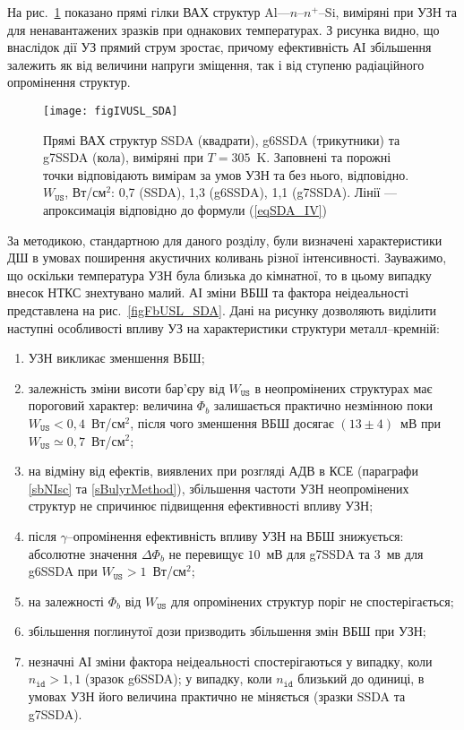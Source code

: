 На рис.~\ref{figIVUSL_SDA} показано прямі гілки ВАХ структур Al---$n$--$n^+$--Si, виміряні при УЗН та для ненавантажених
зразків при однакових температурах.
З рисунка видно, що внаслідок дії УЗ прямий струм зростає, причому
ефективність АІ збільшення залежить як від величини напруги зміщення, так і від ступеню радіаційного опромінення структур.

\begin{figure}[b]
\center
\texttt{[image: figIVUSL\_SDA]}
\caption{\label{figIVUSL_SDA}
Прямі  ВАХ  структур SSDA (квадрати), g6SSDA (трикутники) та g7SSDA (кола), виміряні при $T=305$~K.
Заповнені та порожні точки відповідають вимірам за умов УЗН та без нього, відповідно.
$W_\mathtt{US}$, Вт/см$^2$: 0,7 (SSDA), 1,3 (g6SSDA), 1,1 (g7SSDA).
Лінії --- апроксимація відповідно до формули (\ref{eqSDA_IV})
}%
\end{figure}

За методикою, стандартною для даного розділу, були визначені характеристики ДШ в умовах поширення акустичних коливань різної інтенсивності.
Зауважимо, що оскільки температура УЗН була близька до кімнатної, то в цьому випадку внесок НТКС знехтувано малий.
АІ зміни ВБШ та фактора неідеальності представлена на рис.~\ref{figFbUSL_SDA}.
Дані на рисунку дозволяють виділити наступні особливості  впливу УЗ на характеристики структури металл--кремній:
\begin{enumerate}[label=\asbuk*),leftmargin=0em,itemindent=1.5em]
\item УЗН викликає зменшення ВБШ;

\item залежність зміни висоти бар'єру від $W_\mathtt{US}$ в неопромінених структурах має пороговий характер:
     величина $\Phi_b$ залишається практично незмінною поки \mbox{$W_\mathtt{US}<0,4$~Вт/см$^2$}, після чого
    зменшення ВБШ досягає $(13\pm4)$~мВ при $W_\mathtt{US}\simeq0,7$~Вт/см$^2$;

\item на відміну від ефектів, виявлених при розгляді АДВ в КСЕ (параграфи \ref{sbNIsc} та \ref{sBulyrMethod}), збільшення частоти УЗН неопромінених структур не спричинює
підвищення ефективності впливу УЗН;

\item після $\gamma$--опромінення ефективність впливу УЗН на ВБШ знижується:
абсолютне значення $\Delta\Phi_b$ не перевищує $10$~мВ для g7SSDA та $3$~мв  для g6SSDA при $W_\mathtt{US}>1$~Вт/см$^2$;

\item на залежності $\Phi_b$ від $W_\mathtt{US}$ для опромінених структур поріг не спостерігається;

\item збільшення поглинутої дози призводить збільшення змін ВБШ при УЗН;

\item незначні АІ зміни фактора неідеальності спостерігаються у випадку, коли $n_\mathtt{id}>1,1$ (зразок g6SSDA);
    у випадку, коли $n_\mathtt{id}$ близький до одиниці, в умовах УЗН його величина практично не міняється (зразки SSDA та g7SSDA).
\end{enumerate}

